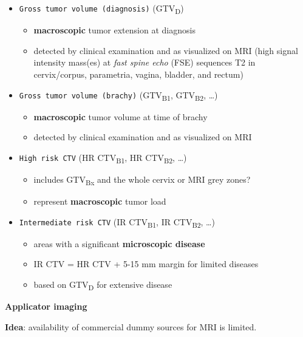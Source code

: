 \documentclass[]{book}
\providecommand{\tightlist}{%
  \setlength{\itemsep}{0pt}\setlength{\parskip}{0pt}}
\theoremstyle{definition}
\theoremstyle{definition}
\theoremstyle{definition}
\theoremstyle{remark}
\begin{document}
\begin{itemize}
\tightlist
\item
  \texttt{Gross\ tumor\ volume\ (diagnosis)} (GTV\textsubscript{D})

  \begin{itemize}
  \tightlist
  \item
    \textbf{macroscopic} tumor extension at diagnosis
  \item
    detected by clinical examination and as visualized on MRI (high
    signal intensity mass(es) at \emph{fast spine echo} (FSE) sequences
    T2 in cervix/corpus, parametria, vagina, bladder, and rectum)
  \end{itemize}
\item
  \texttt{Gross\ tumor\ volume\ (brachy)} (GTV\textsubscript{B1},
  GTV\textsubscript{B2}, \ldots{})

  \begin{itemize}
  \tightlist
  \item
    \textbf{macroscopic} tumor volume at time of brachy
  \item
    detected by clinical examination and as visualized on MRI
  \end{itemize}
\item
  \texttt{High\ risk\ CTV} (HR CTV\textsubscript{B1}, HR
  CTV\textsubscript{B2}, \ldots{})

  \begin{itemize}
  \tightlist
  \item
    includes GTV\textsubscript{Bx} and the whole cervix or MRI grey
    zones?
  \item
    represent \textbf{macroscopic} tumor load
  \end{itemize}
\item
  \texttt{Intermediate\ risk\ CTV} (IR CTV\textsubscript{B1}, IR
  CTV\textsubscript{B2}, \ldots{})

  \begin{itemize}
  \tightlist
  \item
    areas with a significant \textbf{microscopic disease}
  \item
    IR CTV = HR CTV + 5-15 mm margin for limited diseases
  \item
    based on GTV\textsubscript{D} for extensive disease
  \end{itemize}
\end{itemize}

\textbf{Applicator imaging}

\textbf{Idea}: availability of commercial dummy sources for MRI is
limited.
\end{document}
